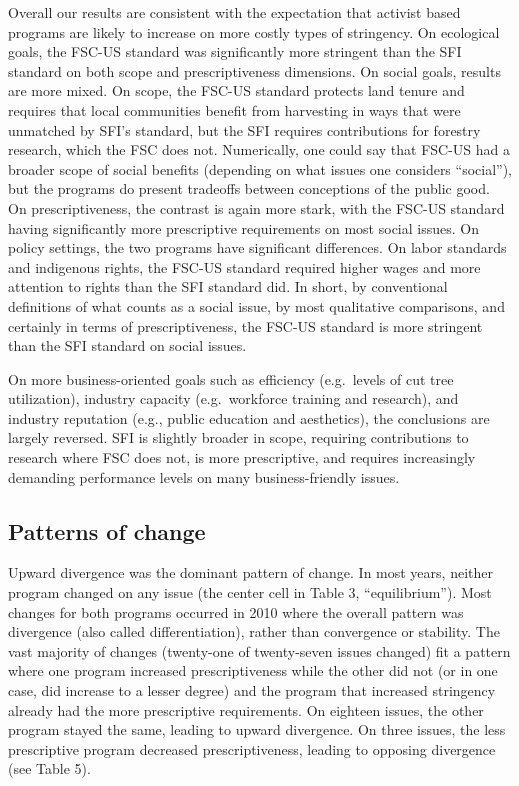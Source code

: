 \documentclass[
      12pt,
            Review ]{article}
\begin{document}
Overall our results are consistent with the expectation that activist
based programs are likely to increase on more costly types of
stringency. On ecological goals, the FSC-US standard was significantly
more stringent than the SFI standard on both scope and prescriptiveness
dimensions. On social goals, results are more mixed. On scope, the
FSC-US standard protects land tenure and requires that local communities
benefit from harvesting in ways that were unmatched by SFI's standard,
but the SFI requires contributions for forestry research, which the FSC
does not. Numerically, one could say that FSC-US had a broader scope of
social benefits (depending on what issues one considers ``social''), but
the programs do present tradeoffs between conceptions of the public
good. On prescriptiveness, the contrast is again more stark, with the
FSC-US standard having significantly more prescriptive requirements on
most social issues. On policy settings, the two programs have
significant differences. On labor standards and indigenous rights, the
FSC-US standard required higher wages and more attention to rights than
the SFI standard did. In short, by conventional definitions of what
counts as a social issue, by most qualitative comparisons, and certainly
in terms of prescriptiveness, the FSC-US standard is more stringent than
the SFI standard on social issues.

On more business-oriented goals such as efficiency (e.g.~levels of cut
tree utilization), industry capacity (e.g.~workforce training and
research), and industry reputation (e.g., public education and
aesthetics), the conclusions are largely reversed. SFI is slightly
broader in scope, requiring contributions to research where FSC does
not, is more prescriptive, and requires increasingly demanding
performance levels on many business-friendly issues.

\subsection{Patterns of change}\label{patterns-of-change}

Upward divergence was the dominant pattern of change. In most years,
neither program changed on any issue (the center cell in Table 3,
``equilibrium''). Most changes for both programs occurred in 2010 where
the overall pattern was divergence (also called differentiation), rather
than convergence or stability. The vast majority of changes (twenty-one
of twenty-seven issues changed) fit a pattern where one program
increased prescriptiveness while the other did not (or in one case, did
increase to a lesser degree) and the program that increased stringency
already had the more prescriptive requirements. On eighteen issues, the
other program stayed the same, leading to upward divergence. On three
issues, the less prescriptive program decreased prescriptiveness,
leading to opposing divergence (see Table 5).
\end{document}
